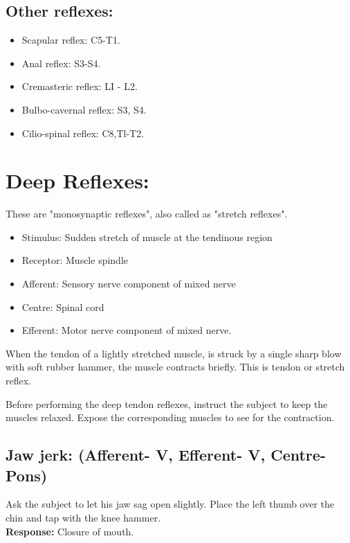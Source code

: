 \documentclass[a4paper,12pt,openany,oneside]{book}
\begin{document}
\subsection*{Other reflexes:}
\begin{itemize}
		\itemsep0em
\item{Scapular reflex: C5-T1.}
\item{Anal reflex: S3-S4.}
\item{Cremasteric reflex: LI - L2.}
\item{Bulbo-cavernal reflex: S3, S4.}
\item{Cilio-spinal reflex: C8,Tl-T2.}
\end{itemize}
\section*{Deep Reflexes:}
These are "monosynaptic reflexes", also called as "stretch reflexes".
\begin{itemize}
		\itemsep0em
\item{Stimulus: Sudden stretch of muscle at the tendinous region}
\item{Receptor: Muscle spindle}
\item{Afferent: Sensory nerve component of mixed nerve}
\item{Centre: Spinal cord}
\item{Efferent: Motor nerve component of mixed nerve.}
\end{itemize}
\par
When the tendon of a lightly stretched muscle, is struck by a single sharp blow with soft rubber hammer, the muscle contracts briefly. This is tendon or stretch reflex.
\par
Before performing the deep tendon reflexes, instruct the subject to keep the muscles relaxed. Expose the corresponding muscles to see for the contraction.
\subsection*{Jaw jerk: (Afferent- V, Efferent- V, Centre-Pons)}
	Ask the subject to let his jaw sag open slightly. Place the left thumb over the chin and tap with the knee hammer.\\
\textbf{Response:} Closure of mouth.
\end{document}
